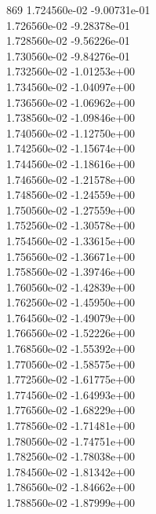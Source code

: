 869	1.724560e-02	-9.00731e-01	\\ 	1.726560e-02	-9.28378e-01	\\ 	1.728560e-02	-9.56226e-01	\\ 	1.730560e-02	-9.84276e-01	\\ 	1.732560e-02	-1.01253e+00	\\ 	1.734560e-02	-1.04097e+00	\\ 	1.736560e-02	-1.06962e+00	\\ 	1.738560e-02	-1.09846e+00	\\ 	1.740560e-02	-1.12750e+00	\\ 	1.742560e-02	-1.15674e+00	\\ 	1.744560e-02	-1.18616e+00	\\ 	1.746560e-02	-1.21578e+00	\\ 	1.748560e-02	-1.24559e+00	\\ 	1.750560e-02	-1.27559e+00	\\ 	1.752560e-02	-1.30578e+00	\\ 	1.754560e-02	-1.33615e+00	\\ 	1.756560e-02	-1.36671e+00	\\ 	1.758560e-02	-1.39746e+00	\\ 	1.760560e-02	-1.42839e+00	\\ 	1.762560e-02	-1.45950e+00	\\ 	1.764560e-02	-1.49079e+00	\\ 	1.766560e-02	-1.52226e+00	\\ 	1.768560e-02	-1.55392e+00	\\ 	1.770560e-02	-1.58575e+00	\\ 	1.772560e-02	-1.61775e+00	\\ 	1.774560e-02	-1.64993e+00	\\ 	1.776560e-02	-1.68229e+00	\\ 	1.778560e-02	-1.71481e+00	\\ 	1.780560e-02	-1.74751e+00	\\ 	1.782560e-02	-1.78038e+00	\\ 	1.784560e-02	-1.81342e+00	\\ 	1.786560e-02	-1.84662e+00	\\ 	1.788560e-02	-1.87999e+00	\\ \hline

